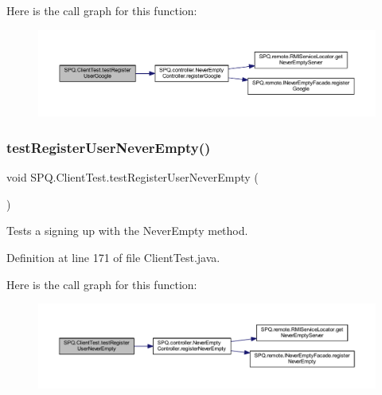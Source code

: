 Here is the call graph for this function\+:
\nopagebreak
\begin{figure}[H]
\begin{center}
\leavevmode
\includegraphics[width=350pt]{class_s_p_q_1_1_client_test_a5f10079da4053b4e2c183b715c246bfa_cgraph}
\end{center}
\end{figure}
\mbox{\label{class_s_p_q_1_1_client_test_ae5a5c27b65ff1dea107d913ea609cb0c}} 
\subsubsection{\texorpdfstring{test\+Register\+User\+Never\+Empty()}{testRegisterUserNeverEmpty()}}
{\footnotesize\ttfamily void S\+P\+Q.\+Client\+Test.\+test\+Register\+User\+Never\+Empty (\begin{DoxyParamCaption}{ }\end{DoxyParamCaption})}

Tests a signing up with the Never\+Empty method. 

Definition at line 171 of file Client\+Test.\+java.

Here is the call graph for this function\+:
\nopagebreak
\begin{figure}[H]
\begin{center}
\leavevmode
\includegraphics[width=350pt]{class_s_p_q_1_1_client_test_ae5a5c27b65ff1dea107d913ea609cb0c_cgraph}
\end{center}
\end{figure}
\mbox{\label{class_s_p_q_1_1_client_test_add97afff5978c2f1b8e950cc4942eda5}} 
